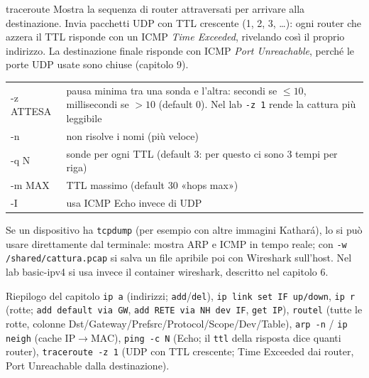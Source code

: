 \begin{scheda}{traceroute}
Mostra la sequenza di router attraversati per arrivare alla destinazione. Invia pacchetti UDP con TTL crescente (1, 2, 3, \dots): ogni router che azzera il TTL risponde con un ICMP \emph{Time Exceeded}, rivelando così il proprio indirizzo. La destinazione finale risponde con ICMP \emph{Port Unreachable}, perché le porte UDP usate sono chiuse (capitolo 9).
\begin{tabularx}{\linewidth}{>{\ttfamily\small}l Y}
-z ATTESA & pausa minima tra una sonda e l'altra: secondi se $\le 10$, millisecondi se $>10$ (default 0). Nel lab \texttt{-z 1} rende la cattura più leggibile\\
-n & non risolve i nomi (più veloce)\\
-q N & sonde per ogni TTL (default 3: per questo ci sono 3 tempi per riga)\\
-m MAX & TTL massimo (default 30 «hops max»)\\
-I & usa ICMP Echo invece di UDP\\
\end{tabularx}
\end{scheda}

\begin{mlbox}
Se un dispositivo ha \texttt{tcpdump} (per esempio con altre immagini Kathará), lo si può usare direttamente dal terminale:  mostra ARP e ICMP in tempo reale; con \texttt{-w /shared/cattura.pcap} si salva un file apribile poi con Wireshark sull'host. Nel lab basic-ipv4 si usa invece il container wireshark, descritto nel capitolo 6.
\end{mlbox}

\begin{appunti}{Riepilogo del capitolo}
\texttt{ip a} (indirizzi; \texttt{add}/\texttt{del}), \texttt{ip link set IF up/down}, \texttt{ip r} (rotte; \texttt{add default via GW}, \texttt{add RETE via NH dev IF}, \texttt{get IP}), \texttt{routel} (tutte le rotte, colonne Dst/Gateway/Prefsrc/Protocol/Scope/Dev/Table), \texttt{arp -n} / \texttt{ip neigh} (cache IP$\to$MAC), \texttt{ping -c N} (Echo; il \texttt{ttl} della risposta dice quanti router), \texttt{traceroute -z 1} (UDP con TTL crescente; Time Exceeded dai router, Port Unreachable dalla destinazione).
\end{appunti}
